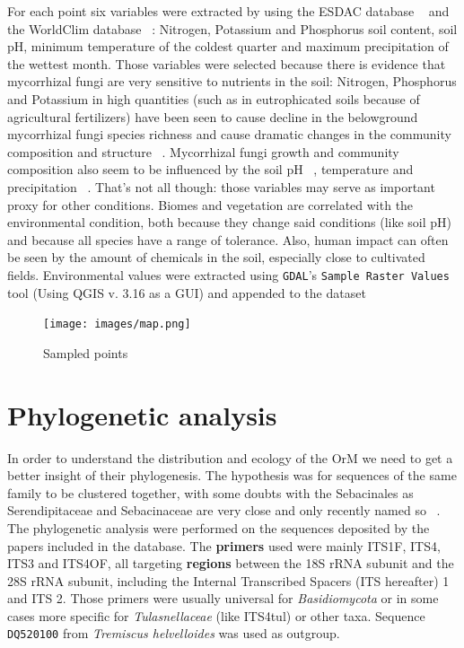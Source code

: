 For each point six variables were extracted by using the ESDAC database ~\citep{esdac} and the WorldClim database ~\citep{hijmans2005}: Nitrogen, Potassium and Phosphorus soil content, soil pH, minimum temperature of the coldest quarter and maximum precipitation of the wettest month. Those variables were selected because there is evidence that mycorrhizal fungi are very sensitive to nutrients in the soil: Nitrogen, Phosphorus and Potassium in high quantities (such as in eutrophicated soils because of agricultural fertilizers) have been seen to cause decline in the belowground mycorrhizal fungi species richness and cause dramatic changes in the community composition and structure ~\citep{lilleskov2002, baar2002, grant2011}. Mycorrhizal fungi growth and community composition also seem to be influenced by the soil pH ~\citep{aarle2002, carrino-kyker2016}, temperature and precipitation ~\citep{rillig2003}. That's not all though: those variables may serve as important proxy for other conditions. Biomes and vegetation are correlated with the environmental condition, both because they change said conditions (like soil pH) and because all species have a range of tolerance. Also, human impact can often be seen by the amount of chemicals in the soil, especially close to cultivated fields.
Environmental values were extracted using \texttt{GDAL}'s \texttt{Sample Raster Values} tool (Using QGIS v. 3.16 as a GUI) and appended to the dataset

\begin{figure}[htbp]
\centering
\texttt{[image: images/map.png]}
\caption{Sampled points}
\end{figure}

\chapter{Phylogenetic analysis}
\label{phylogeneticanalysis}

In order to understand the distribution and ecology of the OrM we need to get a better insight of their phylogenesis. The hypothesis was for sequences of the same family to be clustered together, with some doubts with the Sebacinales as Serendipitaceae and Sebacinaceae are very close and only recently named so ~\citep{weiss2016}.
The phylogenetic analysis were performed on the sequences deposited by the papers included in the database.
The \textbf{primers} used were mainly ITS1F, ITS4, ITS3 and ITS4OF, all targeting \textbf{regions} between the 18S rRNA subunit and the 28S rRNA subunit, including the Internal Transcribed Spacers (ITS hereafter) 1 and ITS 2. Those primers were usually universal for \emph{Basidiomycota} or in some cases more specific for \emph{Tulasnellaceae} (like ITS4tul) or other taxa.
Sequence \texttt{DQ520100} from \emph{Tremiscus helvelloides} was used as outgroup.

